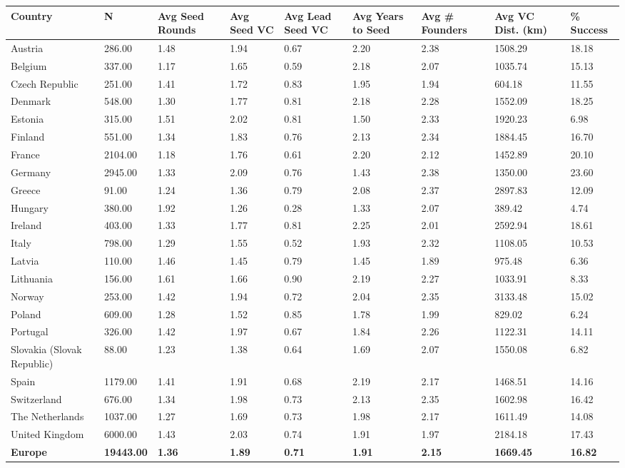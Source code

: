 \begin{table}[ht]
\centering
\begin{tabular}{lllllllll}
  \toprule
Country & N & Avg Seed Rounds & Avg Seed VC & Avg Lead Seed VC & Avg Years to Seed & Avg \# Founders & Avg VC Dist. (km) & \% Success \\ 
  \midrule
Austria & 286.00 & 1.48 & 1.94 & 0.67 & 2.20 & 2.38 & 1508.29 & 18.18 \\ 
  Belgium & 337.00 & 1.17 & 1.65 & 0.59 & 2.18 & 2.07 & 1035.74 & 15.13 \\ 
  Czech Republic & 251.00 & 1.41 & 1.72 & 0.83 & 1.95 & 1.94 & 604.18 & 11.55 \\ 
  Denmark & 548.00 & 1.30 & 1.77 & 0.81 & 2.18 & 2.28 & 1552.09 & 18.25 \\ 
  Estonia & 315.00 & 1.51 & 2.02 & 0.81 & 1.50 & 2.33 & 1920.23 & 6.98 \\ 
  Finland & 551.00 & 1.34 & 1.83 & 0.76 & 2.13 & 2.34 & 1884.45 & 16.70 \\ 
  France & 2104.00 & 1.18 & 1.76 & 0.61 & 2.20 & 2.12 & 1452.89 & 20.10 \\ 
  Germany & 2945.00 & 1.33 & 2.09 & 0.76 & 1.43 & 2.38 & 1350.00 & 23.60 \\ 
  Greece & 91.00 & 1.24 & 1.36 & 0.79 & 2.08 & 2.37 & 2897.83 & 12.09 \\ 
  Hungary & 380.00 & 1.92 & 1.26 & 0.28 & 1.33 & 2.07 & 389.42 & 4.74 \\ 
  Ireland & 403.00 & 1.33 & 1.77 & 0.81 & 2.25 & 2.01 & 2592.94 & 18.61 \\ 
  Italy & 798.00 & 1.29 & 1.55 & 0.52 & 1.93 & 2.32 & 1108.05 & 10.53 \\ 
  Latvia & 110.00 & 1.46 & 1.45 & 0.79 & 1.45 & 1.89 & 975.48 & 6.36 \\ 
  Lithuania & 156.00 & 1.61 & 1.66 & 0.90 & 2.19 & 2.27 & 1033.91 & 8.33 \\ 
  Norway & 253.00 & 1.42 & 1.94 & 0.72 & 2.04 & 2.35 & 3133.48 & 15.02 \\ 
  Poland & 609.00 & 1.28 & 1.52 & 0.85 & 1.78 & 1.99 & 829.02 & 6.24 \\ 
  Portugal & 326.00 & 1.42 & 1.97 & 0.67 & 1.84 & 2.26 & 1122.31 & 14.11 \\ 
  Slovakia (Slovak Republic) & 88.00 & 1.23 & 1.38 & 0.64 & 1.69 & 2.07 & 1550.08 & 6.82 \\ 
  Spain & 1179.00 & 1.41 & 1.91 & 0.68 & 2.19 & 2.17 & 1468.51 & 14.16 \\ 
  Switzerland & 676.00 & 1.34 & 1.98 & 0.73 & 2.13 & 2.35 & 1602.98 & 16.42 \\ 
  The Netherlands & 1037.00 & 1.27 & 1.69 & 0.73 & 1.98 & 2.17 & 1611.49 & 14.08 \\ 
  United Kingdom & 6000.00 & 1.43 & 2.03 & 0.74 & 1.91 & 1.97 & 2184.18 & 17.43 \\ 
  \textbf{Europe} & \textbf{19443.00} & \textbf{1.36} & \textbf{1.89} & \textbf{0.71} & \textbf{1.91} & \textbf{2.15} & \textbf{1669.45} & \textbf{16.82} \\ 
   \bottomrule
\end{tabular}
\label{tab:seed_summary_clean}
\end{table}
